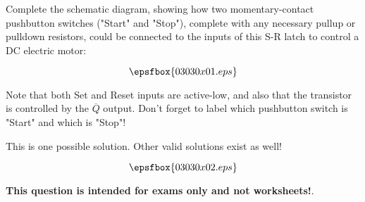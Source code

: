 

Complete the schematic diagram, showing how two momentary-contact pushbutton switches ("Start" and "Stop"), complete with any necessary pullup or pulldown resistors, could be connected to the inputs of this S-R latch to control a DC electric motor:

$$\epsfbox{03030x01.eps}$$

Note that both Set and Reset inputs are active-low, and also that the transistor is controlled by the $\overline{Q}$ output.  Don't forget to label which pushbutton switch is "Start" and which is "Stop"!







This is one possible solution.  Other valid solutions exist as well!

$$\epsfbox{03030x02.eps}$$







{\bf This question is intended for exams only and not worksheets!}.




